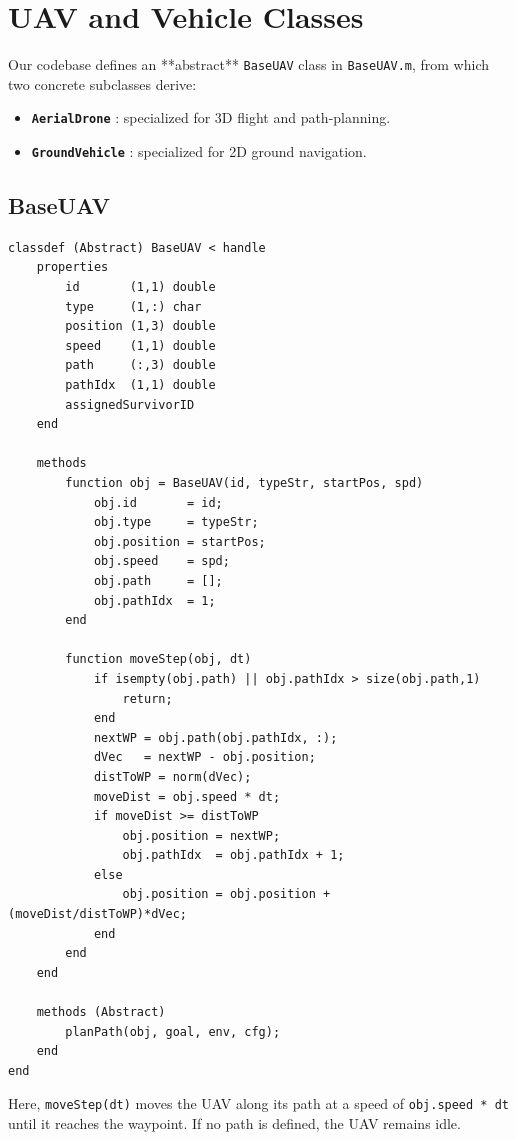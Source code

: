 \documentclass[12pt,a4paper]{report}
\begin{document}
\section{UAV and Vehicle Classes}
\label{sec:uav_classes}

Our codebase defines an **abstract** \texttt{BaseUAV} class in \texttt{BaseUAV.m}, 
from which two concrete subclasses derive:
\begin{itemize}
    \item \textbf{\texttt{AerialDrone}} : specialized for 3D flight and path-planning.
    \item \textbf{\texttt{GroundVehicle}} : specialized for 2D ground navigation.
\end{itemize}

\subsection{BaseUAV}
\label{sec:baseuav}

\begin{verbatim}
classdef (Abstract) BaseUAV < handle
    properties
        id       (1,1) double
        type     (1,:) char
        position (1,3) double
        speed    (1,1) double
        path     (:,3) double
        pathIdx  (1,1) double
        assignedSurvivorID
    end

    methods
        function obj = BaseUAV(id, typeStr, startPos, spd)
            obj.id       = id;
            obj.type     = typeStr;
            obj.position = startPos;
            obj.speed    = spd;
            obj.path     = [];
            obj.pathIdx  = 1;
        end

        function moveStep(obj, dt)
            if isempty(obj.path) || obj.pathIdx > size(obj.path,1)
                return;
            end
            nextWP = obj.path(obj.pathIdx, :);
            dVec   = nextWP - obj.position;
            distToWP = norm(dVec);
            moveDist = obj.speed * dt;
            if moveDist >= distToWP
                obj.position = nextWP;
                obj.pathIdx  = obj.pathIdx + 1;
            else
                obj.position = obj.position + (moveDist/distToWP)*dVec;
            end
        end
    end

    methods (Abstract)
        planPath(obj, goal, env, cfg);
    end
end
\end{verbatim}
Here, \texttt{moveStep(dt)} moves the UAV along its path at a speed of 
\texttt{obj.speed * dt} until it reaches the waypoint. If no path is defined, 
the UAV remains idle.
\end{document}
